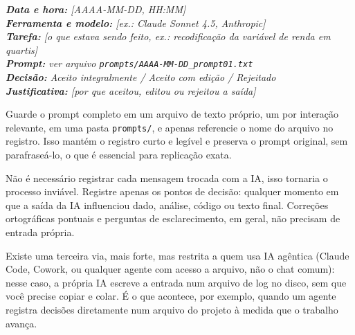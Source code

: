 \documentclass[11pt,a4paper]{article}
\newcommand{\iconBookmark}[1]{%
  \begin{tikzpicture}[baseline=-0.55ex]
    \draw[#1,line width=1pt,line join=round] (-0.11,0.15) -- (0.11,0.15) -- (0.11,-0.15) -- (0,-0.03) -- (-0.11,-0.15) -- cycle;
  \end{tikzpicture}}
\begin{document}
\begin{leitura}[title={\iconBookmark{white}\ \ Modelo de entrada para o seu registro de decisões}]
\itshape
\textbf{Data e hora:} [AAAA-MM-DD, HH:MM]\\
\textbf{Ferramenta e modelo:} [ex.: Claude Sonnet 4.5, Anthropic]\\
\textbf{Tarefa:} [o que estava sendo feito, ex.: recodificação da variável de renda em quartis]\\
\textbf{Prompt:} ver arquivo \texttt{prompts/AAAA-MM-DD\_prompt01.txt}\\
\textbf{Decisão:} Aceito integralmente / Aceito com edição / Rejeitado\\
\textbf{Justificativa:} [por que aceitou, editou ou rejeitou a saída]
\end{leitura}

\begin{dica}
Guarde o prompt completo em um arquivo de texto próprio, um por interação relevante, em uma pasta \texttt{prompts/}, e apenas referencie o nome do arquivo no registro. Isso mantém o registro curto e legível e preserva o prompt original, sem parafraseá-lo, o que é essencial para replicação exata.
\end{dica}

\vspace{4pt}
Não é necessário registrar cada mensagem trocada com a IA, isso tornaria o processo inviável. Registre apenas os pontos de decisão: qualquer momento em que a saída da IA influenciou dado, análise, código ou texto final. Correções ortográficas pontuais e perguntas de esclarecimento, em geral, não precisam de entrada própria.

\begin{dica}
Existe uma terceira via, mais forte, mas restrita a quem usa IA agêntica (Claude Code, Cowork, ou qualquer agente com acesso a arquivo, não o chat comum): nesse caso, a própria IA escreve a entrada num arquivo de log no disco, sem que você precise copiar e colar. É o que acontece, por exemplo, quando um agente registra decisões diretamente num arquivo do projeto à medida que o trabalho avança.
\end{dica}

\end{document}
